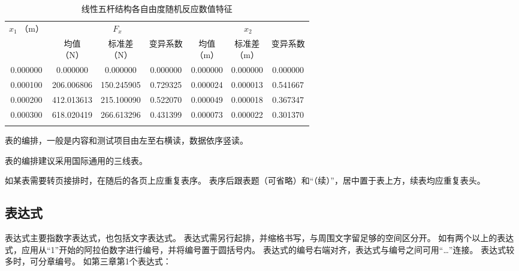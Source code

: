 \begin{table}[H]
    \centering
    \caption{线性五杆结构各自由度随机反应数值特征}
    \label{tab:example}
    \begin{tabular}{c|c|c|c|c|c|c}
        \Xhline{1.5pt}
        \multirowcell{2}[-7pt][c]{$x_{1}$                                                \\（m）} & \multicolumn{3}{c|}{$F_{x}$} & \multicolumn{3}{c}{$x_{2}$}                                             \\
        \cline{2-7}
                 & \makecell{均值                                                          \\（N）}                        & \makecell{标准差\\（N）}                      & 变异系数     & \makecell{均值\\（m）}    & \makecell{标准差\\（m）}   & 变异系数     \\
        \hline
        0.000000 & 0.000000     & 0.000000   & 0.000000 & 0.000000 & 0.000000 & 0.000000 \\
        0.000100 & 206.006806   & 150.245905 & 0.729325 & 0.000024 & 0.000013 & 0.541667 \\
        0.000200 & 412.013613   & 215.100090 & 0.522070 & 0.000049 & 0.000018 & 0.367347 \\
        0.000300 & 618.020419   & 266.613296 & 0.431399 & 0.000073 & 0.000022 & 0.301370 \\
        \Xhline{1.5pt}
    \end{tabular}
\end{table}

表的编排，一般是内容和测试项目由左至右横读，数据依序竖读。

表的编排建议采用国际通用的三线表。

如某表需要转页接排时，在随后的各页上应重复表序。
表序后跟表题（可省略）和“（续）”，居中置于表上方，续表均应重复表头。

\subsection{表达式}

表达式主要指数字表达式，也包括文字表达式。
表达式需另行起排，并缩格书写，与周围文字留足够的空间区分开。
如有两个以上的表达式，应用从“1”开始的阿拉伯数字进行编号，并将编号置于圆括号内。
表达式的编号右端对齐，表达式与编号之间可用“…”连接。
表达式较多时，可分章编号。
如第三章第1个表达式：

